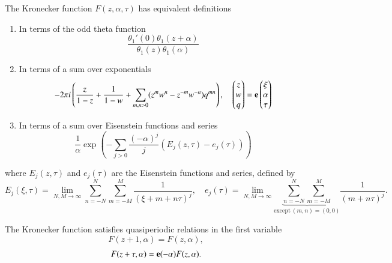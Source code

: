 \begin{definition}
    The Kronecker function $F(z,\alpha,\tau)$ has equivalent definitions
    \begin{enumerate}
        \item In terms of the odd theta function
        \begin{equation}\frac{\theta_1'(0)\theta_1(z+\alpha)}{\theta_1(z)\theta_1(\alpha)}\end{equation}
        \item In terms of a sum over exponentials
        \begin{equation}-2\pi i \left(\frac{z}{1-z} + \frac{1}{1-w} + \sum_{m,n > 0} (z^m w^n - z^{-m} w^{-n}) q^{mn}\right) , \quad \begin{pmatrix} z \\ w \\ q \end{pmatrix} = \mathbf{e} \begin{pmatrix}\xi \\ \alpha \\ \tau\end{pmatrix}\end{equation}
        \item In terms of a sum over Eisenstein functions and series
        \begin{equation}\frac{1}{\alpha} \exp\left(-\sum_{j > 0} \frac{(-\alpha)^j}{j} (E_j(z,\tau) - e_j(\tau))\right)\end{equation}
    \end{enumerate}
    where $E_j(z,\tau)$ and $e_j(\tau)$ are the Eisenstein functions and series, defined by
    \begin{equation}
        E_j(\xi,\tau) = \lim_{N,M\rightarrow \infty} \sum_{n=-N}^N \sum_{m=-M}^M \frac{1}{(\xi+m+n\tau)^j}, \quad e_j(\tau) = \lim_{N,M\rightarrow \infty} \underset{\mathrm{except \ }(m,n)=(0,0)}{\underbrace{\sum_{n=-N}^N \sum_{m=-M}^M}} \frac{1}{(m+n\tau)^j}.
    \end{equation}

    The Kronecker function satisfies quasiperiodic relations in the first variable
    \begin{equation}
        F(z+1,\alpha)=F(z,\alpha),
    \end{equation}
    \begin{equation}
        F(z+\tau,\alpha)=\mathbf{e}(-\alpha)F(z,\alpha).
    \end{equation}
\end{definition}

